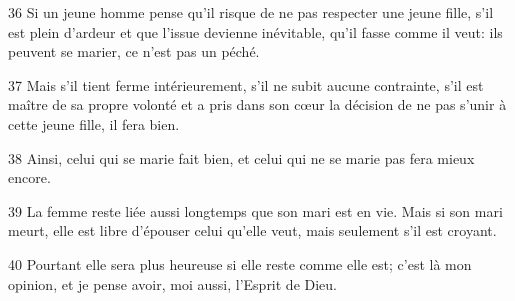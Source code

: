 
36 Si un jeune homme pense qu’il risque de ne pas respecter une jeune fille, s’il est plein d’ardeur et que l’issue devienne inévitable, qu’il fasse comme il veut: ils peuvent se marier, ce n’est pas un péché.

37 Mais s’il tient ferme intérieurement, s’il ne subit aucune contrainte, s’il est maître de sa propre volonté et a pris dans son cœur la décision de ne pas s’unir à cette jeune fille, il fera bien.

38 Ainsi, celui qui se marie fait bien, et celui qui ne se marie pas fera mieux encore.

39 La femme reste liée aussi longtemps que son mari est en vie. Mais si son mari meurt, elle est libre d’épouser celui qu’elle veut, mais seulement s’il est croyant.

40 Pourtant elle sera plus heureuse si elle reste comme elle est; c’est là mon opinion, et je pense avoir, moi aussi, l’Esprit de Dieu.